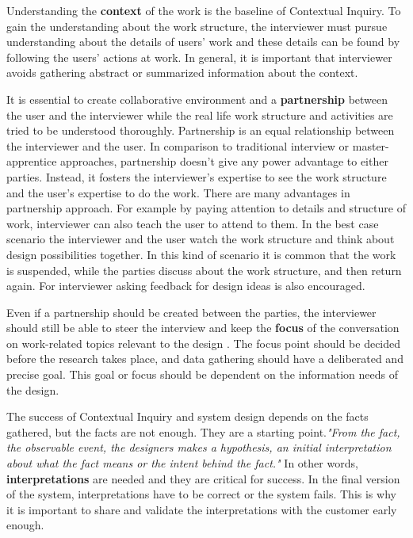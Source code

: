 \documentclass[12pt,a4paper,oneside,pdftex]{report}
\begin{document}
Understanding the \textbf{context} of the work is the baseline of Contextual Inquiry. To gain the understanding about the work structure, the interviewer must pursue understanding about the details of users' work and these details can be found by following the users' actions at work. In general, it is important that interviewer avoids gathering abstract or summarized information about the context.\cite{RefWorks:21}

It is essential to create collaborative environment and a \textbf{partnership} between the user and the interviewer while the real life work structure and activities are tried to be understood thoroughly. Partnership is an equal relationship between the interviewer and the user. In comparison to traditional interview or master-apprentice approaches, partnership doesn't give any power advantage to either parties. Instead, it fosters the interviewer's expertise to see the work structure and the user's expertise to do the work. There are many advantages in partnership approach. For example by paying attention to details and structure of work, interviewer can also teach the user to attend to them. In the best case scenario the interviewer and the user watch the work structure and think about design possibilities together. In this kind of scenario it is common that the work is suspended, while the parties discuss about the work structure, and then return again. For interviewer asking feedback for design ideas is also encouraged.\cite{RefWorks:21}

Even if a partnership should be created between the parties, the interviewer should still be able to steer the interview and keep the \textbf{focus} of the conversation on work-related topics relevant to the design \cite{RefWorks:21}. The focus point should be decided before the research takes place, and data gathering should have a deliberated and precise goal. This goal or focus should be dependent on the information needs of the design.\cite{RefWorks:22}

The success of Contextual Inquiry and system design depends on the facts gathered, but the facts are not enough. They are a starting point.\textit{"From the fact, the observable event, the designers makes a hypothesis, an initial interpretation about what the fact means or the intent behind the fact."}\cite{RefWorks:21} In other words, \textbf{interpretations} are needed and they are critical for success. In the final version of the system, interpretations have to be correct or the system fails. This is why it is important to share and validate the interpretations with the customer early enough. \cite{RefWorks:21}
\end{document}
